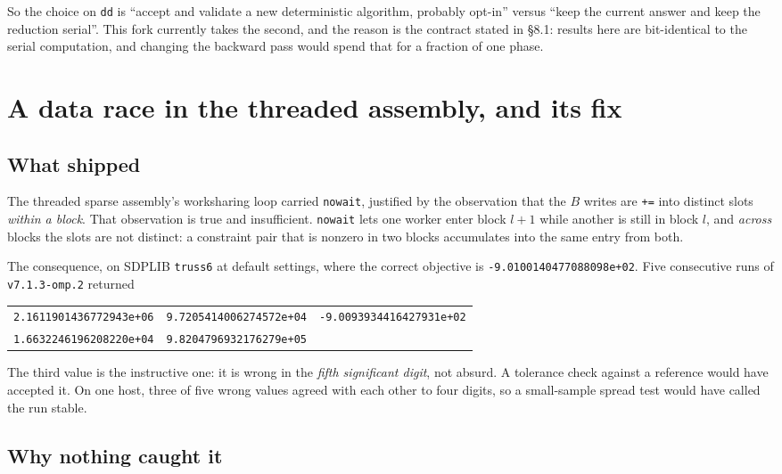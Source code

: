 \documentclass[11pt]{article}
\newcommand{\bMat}{B}
\newcommand{\code}[1]{\texttt{#1}}
\begin{document}
So the choice on \code{dd} is ``accept and validate a new deterministic algorithm, probably
opt-in'' versus ``keep the current answer and keep the reduction serial''. This fork currently
takes the second, and the reason is the contract stated in \S8.1: results here are bit-identical to
the serial computation, and changing the backward pass would spend that for a fraction of one
phase.

\section{A data race in the threaded assembly, and its fix}
\label{sec:race}

\subsection{What shipped}

The threaded sparse assembly's worksharing loop carried \code{nowait}, justified by the observation
that the $\bMat$ writes are \code{+=} into distinct slots \emph{within a block}. That observation
is true and insufficient. \code{nowait} lets one worker enter block $l+1$ while another is still in
block $l$, and \emph{across} blocks the slots are not distinct: a constraint pair that is nonzero
in two blocks accumulates into the same entry from both.

The consequence, on SDPLIB \code{truss6} at default settings, where the correct objective is
\code{-9.0100140477088098e+02}. Five consecutive runs of \code{v7.1.3-omp.2} returned

\begin{center}
\small
\begin{tabular}{@{}lll@{}}
\toprule
\code{2.1611901436772943e+06} & \code{9.7205414006274572e+04} & \code{-9.0093934416427931e+02} \\
\code{1.6632246196208220e+04} & \code{9.8204796932176279e+05} & \\
\bottomrule
\end{tabular}
\end{center}

The third value is the instructive one: it is wrong in the \emph{fifth significant digit}, not
absurd. A tolerance check against a reference would have accepted it. On one host, three of five
wrong values agreed with each other to four digits, so a small-sample spread test would have
called the run stable.

\subsection{Why nothing caught it}
\end{document}
